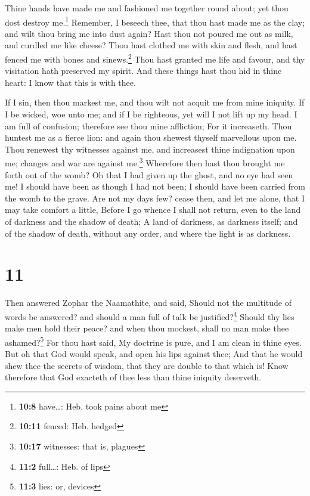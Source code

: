  Thine hands have made me and fashioned me together round
about; yet thou dost destroy me.\footnote{\textbf{10:8} have\ldots: Heb.
  took pains about me}  Remember, I beseech thee, that
thou hast made me as the clay; and wilt thou bring me into dust again?
 Hast thou not poured me out as milk, and curdled me like
cheese?  Thou hast clothed me with skin and flesh, and
hast fenced me with bones and sinews.\footnote{\textbf{10:11} fenced:
  Heb. hedged}  Thou hast granted me life and favour, and
thy visitation hath preserved my spirit.  And these
things hast thou hid in thine heart: I know that this is with thee.

 If I sin, then thou markest me, and thou wilt not acquit
me from mine iniquity.  If I be wicked, woe unto me; and
if I be righteous, yet will I not lift up my head. I am full of
confusion; therefore see thou mine affliction;  For it
increaseth. Thou huntest me as a fierce lion: and again thou shewest
thyself marvellous upon me.  Thou renewest thy witnesses
against me, and increasest thine indignation upon me; changes and war
are against me.\footnote{\textbf{10:17} witnesses: that is, plagues}
 Wherefore then hast thou brought me forth out of the
womb? Oh that I had given up the ghost, and no eye had seen me!
 I should have been as though I had not been; I should
have been carried from the womb to the grave.  Are not my
days few? cease then, and let me alone, that I may take comfort a
little,  Before I go whence I shall not return, even to
the land of darkness and the shadow of death;  A land of
darkness, as darkness itself; and of the shadow of death, without any
order, and where the light is as darkness.

\hypertarget{section-10}{%
\section{11}\label{section-10}}

 Then answered Zophar the Naamathite, and said,
 Should not the multitude of words be answered? and should
a man full of talk be justified?\footnote{\textbf{11:2} full\ldots: Heb.
  of lips}  Should thy lies make men hold their peace? and
when thou mockest, shall no man make thee ashamed?\footnote{\textbf{11:3}
  lies: or, devices}  For thou hast said, My doctrine is
pure, and I am clean in thine eyes.  But oh that God would
speak, and open his lips against thee;  And that he would
shew thee the secrets of wisdom, that they are double to that which is!
Know therefore that God exacteth of thee less than thine iniquity
deserveth.

